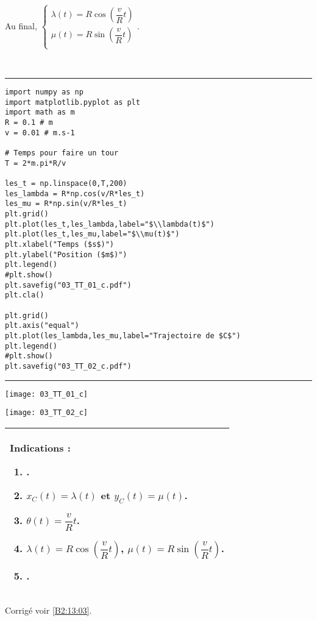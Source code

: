 Au final, 
$\left\{
\begin{array}{l}
\lambda(t) = R\cos\left( \dfrac{v}{R}t\right)\\
\mu(t) = R\sin\left( \dfrac{v}{R}t\right)\\
\end{array}
\right.
$.

\else
\fi


\ifprof
~\\
\noindent\rule{\linewidth}{.1mm}
\begin{lstlisting}
import numpy as np
import matplotlib.pyplot as plt
import math as m
R = 0.1 # m
v = 0.01 # m.s-1 

# Temps pour faire un tour 
T = 2*m.pi*R/v

les_t = np.linspace(0,T,200)
les_lambda = R*np.cos(v/R*les_t)
les_mu = R*np.sin(v/R*les_t)
plt.grid()
plt.plot(les_t,les_lambda,label="$\\lambda(t)$")
plt.plot(les_t,les_mu,label="$\\mu(t)$")
plt.xlabel("Temps ($s$)")
plt.ylabel("Position ($m$)")
plt.legend()
#plt.show()
plt.savefig("03_TT_01_c.pdf")
plt.cla()

plt.grid()
plt.axis("equal")
plt.plot(les_lambda,les_mu,label="Trajectoire de $C$")
plt.legend()
#plt.show()
plt.savefig("03_TT_02_c.pdf")
\end{lstlisting}
\noindent\rule{\linewidth}{.1mm}

\begin{minipage}[c]{.45\linewidth}
\begin{center}
\texttt{[image: 03\_TT\_01\_c]}
\end{center}
\end{minipage} \hfill
\begin{minipage}[c]{.45\linewidth}
\begin{center}
\texttt{[image: 03\_TT\_02\_c]}
\end{center}
\end{minipage} 
\else
\fi


\ifprof
\else
\footnotesize
\begin{center}
\begin{tabular}{|p{.9\linewidth}|}
\hline
Indications :
\begin{enumerate}
\item .
\item $x_C(t)= \lambda(t)$ et $y_C(t)= \mu(t)$.
\item $ \theta(t)=\dfrac{v}{R}t$.
\item $\lambda(t) = R\cos\left( \dfrac{v}{R}t\right)$, $\mu(t) = R\sin\left( \dfrac{v}{R}t\right)$.
\item .
\end{enumerate} \\ \hline
\end{tabular}
\end{center}
\normalsize

\begin{flushright}
\footnotesize{Corrigé  voir \ref{B2:13:03}.}
\end{flushright}%
\fi


